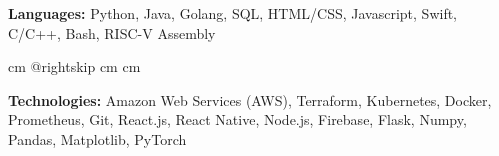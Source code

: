 \documentclass[10pt, a4paper]{article}
\begin{document}
            \textbf{Languages:} Python, Java, Golang, SQL, HTML/CSS, Javascript, Swift, C/C++, Bash, RISC-V Assembly

            \par\endgroup

        \vspace{0.12 cm}
            \begingroup\raggedright    {} cm
            \advance\csname @rightskip cm
            \advance{} cm

            \textbf{Technologies:} Amazon Web Services (AWS), Terraform, Kubernetes, Docker, Prometheus, Git, React.js, React Native, Node.js, Firebase, Flask, Numpy, Pandas, Matplotlib, PyTorch

            \par\endgroup
\end{document}
